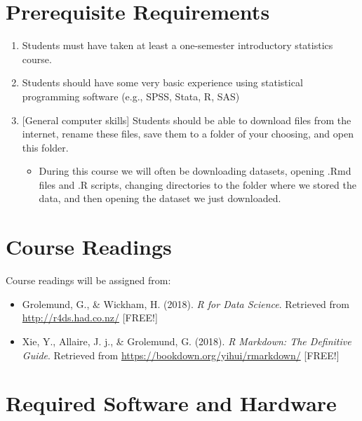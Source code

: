 \documentclass[11pt,]{article}
\providecommand{\tightlist}{%
  \setlength{\itemsep}{0pt}\setlength{\parskip}{0pt}}
\begin{document}
\section{Prerequisite Requirements}\label{prerequisite-requirements}

\begin{enumerate}
\def\labelenumi{\arabic{enumi}.}
\tightlist
\item
  Students must have taken at least a one-semester introductory
  statistics course.\\
\item
  Students should have some very basic experience using statistical
  programming software (e.g., SPSS, Stata, R, SAS)
\item
  {[}General computer skills{]} Students should be able to download
  files from the internet, rename these files, save them to a folder of
  your choosing, and open this folder.

  \begin{itemize}
  \tightlist
  \item
    During this course we will often be downloading datasets, opening
    .Rmd files and .R scripts, changing directories to the folder where
    we stored the data, and then opening the dataset we just downloaded.
  \end{itemize}
\end{enumerate}

\section{Course Readings}\label{course-readings}

Course readings will be assigned from:

\begin{itemize}
\tightlist
\item
  Grolemund, G., \& Wickham, H. (2018). \emph{R for Data Science}.
  Retrieved from \url{http://r4ds.had.co.nz/} {[}FREE!{]}
\item
  Xie, Y., Allaire, J. j., \& Grolemund, G. (2018). \emph{R Markdown:
  The Definitive Guide}. Retrieved from
  \url{https://bookdown.org/yihui/rmarkdown/} {[}FREE!{]}
\end{itemize}

\section{Required Software and
Hardware}\label{required-software-and-hardware}
\end{document}

